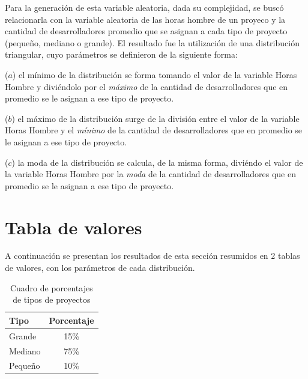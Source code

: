 Para la generación de esta variable aleatoria, dada su complejidad, se buscó relacionarla con la variable aleatoria de las horas hombre de un proyeco y la cantidad de desarrolladores
promedio que se asignan a cada tipo de proyecto (pequeño, mediano o grande). El resultado fue la utilización de una distribución triangular, cuyo parámetros se definieron de la siguiente 
forma:

\begin{itemize*}
    \item[($a$)] el mínimo de la distribución se forma tomando el valor de la variable Horas Hombre y diviéndolo por el \textit{máximo} de la cantidad de desarrolladores que en promedio
    se le asignan a ese tipo de proyecto.
    \item[($b$)] el máximo de la distribución surge de la división entre el valor de la variable Horas Hombre y el \textit{mínimo} de la cantidad de desarrolladores que en promedio
    se le asignan a ese tipo de proyecto.
    \item[($c$)] la moda de la distribución se calcula, de la misma forma, diviéndo el valor de la variable Horas Hombre por la \textit{moda} de la cantidad de desarrolladores que en promedio
    se le asignan a ese tipo de proyecto.
\end{itemize*}
 

\section*{Tabla de valores}

A continuación se presentan los resultados de esta sección resumidos en 2 tablas de valores, con los parámetros de cada distribución.\\

\begin{table}[H]
\begin{center}
\begin{tabular}{|l|c|}
\hline
    Tipo        & Porcentaje\\
\hline
    Grande      & 15\%\\
\hline
    Mediano     & 75\%\\
\hline
    Pequeño     & 10\%\\
\hline
\end{tabular}

\end{center}

\caption{Cuadro de porcentajes de tipos de proyectos}
\label{tab:tipo-proyecto}

\end{table}

